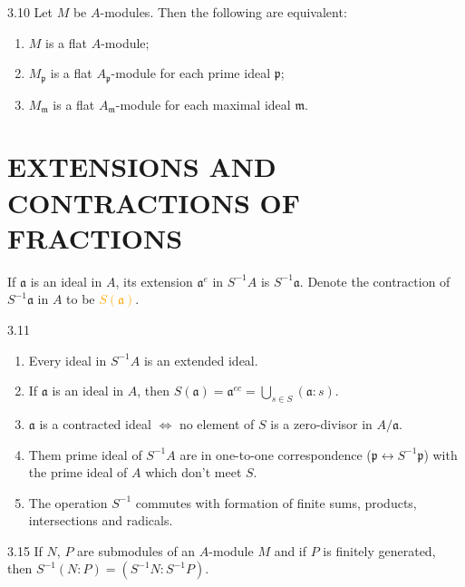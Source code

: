 \begin{proposition}{3.10}
	Let $M$ be $A$-modules. Then the following are equivalent:
	\begin{enumerate}[label=\textup{(\roman*)}]
		\item $M$ is a flat $A$-module;
		\item $M_\mathfrak{p}$ is a flat $A_\mathfrak{p}$-module for each prime ideal $\mathfrak{p}$;
		\item $M_\mathfrak{m}$ is a flat $A_\mathfrak{m}$-module for each maximal ideal $\mathfrak{m}$.
	\end{enumerate}
\end{proposition}

\section*{EXTENSIONS AND CONTRACTIONS OF FRACTIONS}

If $\mathfrak{a}$ is an ideal in $A$, its extension $\mathfrak{a}^e$ in $S^{-1}A$ is $S^{-1}\mathfrak{a}$. Denote the contraction of $S^{-1}\mathfrak{a}$ in $A$ to be \textcolor{orange}{$S(\mathfrak{a})$}.

\begin{proposition}{3.11}
	\begin{enumerate}[label=\textup{(\roman*)},ref=\thepropositiontemp(\roman*)]
		\item\label{3.11.1} Every ideal in $S^{-1}A$ is an extended ideal.
		\item\label{3.11.2} If $\mathfrak{a}$ is an ideal in $A$, then $S(\mathfrak{a})=\mathfrak{a}^{ec}=\bigcup_{s\in S}(\mathfrak{a}:s)$.
		\item\label{3.11.3} $\mathfrak{a}$ is a contracted ideal $\Leftrightarrow$ no element of $S$ is a zero-divisor in $A/\mathfrak{a}$.
		\item\label{3.11.4} Them prime ideal of $S^{-1}A$ are in one-to-one correspondence ($\mathfrak{p}\leftrightarrow S^{-1}\mathfrak{p}$) with the prime ideal of $A$ which don't meet $S$.
		\item\label{3.11.5} The operation $S^{-1}$ commutes with formation of finite sums, products, intersections and radicals.
	\end{enumerate}
\end{proposition}

\begin{corollary}{3.15}
	If $N$, $P$ are submodules of an $A$-module $M$ and if $P$ is finitely generated, then $S^{-1}(N:P)=\left(S^{-1}N:S^{-1}P\right)$.
\end{corollary}


